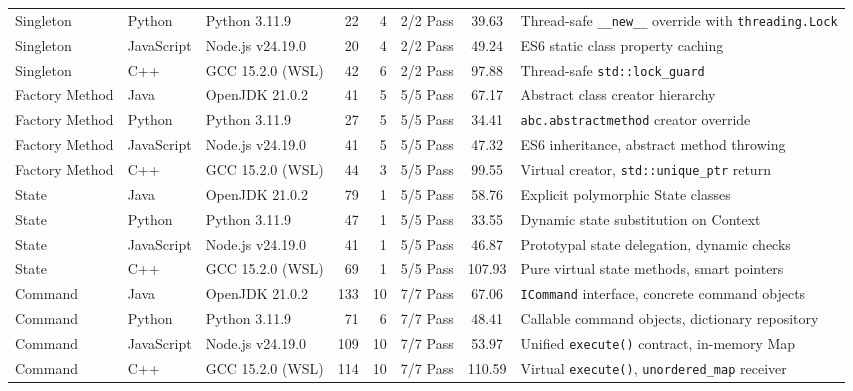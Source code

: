 \documentclass[11pt,a4paper]{article}
\begin{document}
\begin{xltabular}{\linewidth}{@{}p{22mm}p{16mm}p{25mm}rrrcX@{}}
Singleton & Python & Python 3.11.9 & 22 & 4 & 2/2 Pass & 39.63 & Thread-safe \texttt{\_\_new\_\_} override with \texttt{threading.Lock}\\
Singleton & JavaScript & Node.js v24.19.0 & 20 & 4 & 2/2 Pass & 49.24 & ES6 static class property caching\\
Singleton & C++ & GCC 15.2.0 (WSL) & 42 & 6 & 2/2 Pass & 97.88 & Thread-safe \texttt{std::lock\_guard}\\\midrule
Factory Method & Java & OpenJDK 21.0.2 & 41 & 5 & 5/5 Pass & 67.17 & Abstract class creator hierarchy\\
Factory Method & Python & Python 3.11.9 & 27 & 5 & 5/5 Pass & 34.41 & \texttt{abc.abstractmethod} creator override\\
Factory Method & JavaScript & Node.js v24.19.0 & 41 & 5 & 5/5 Pass & 47.32 & ES6 inheritance, abstract method throwing\\
Factory Method & C++ & GCC 15.2.0 (WSL) & 44 & 3 & 5/5 Pass & 99.55 & Virtual creator, \texttt{std::unique\_ptr} return\\\midrule
State & Java & OpenJDK 21.0.2 & 79 & 1 & 5/5 Pass & 58.76 & Explicit polymorphic State classes\\
State & Python & Python 3.11.9 & 47 & 1 & 5/5 Pass & 33.55 & Dynamic state substitution on Context\\
State & JavaScript & Node.js v24.19.0 & 41 & 1 & 5/5 Pass & 46.87 & Prototypal state delegation, dynamic checks\\
State & C++ & GCC 15.2.0 (WSL) & 69 & 1 & 5/5 Pass & 107.93 & Pure virtual state methods, smart pointers\\\midrule
Command & Java & OpenJDK 21.0.2 & 133 & 10 & 7/7 Pass & 67.06 & \texttt{ICommand} interface, concrete command objects\\
Command & Python & Python 3.11.9 & 71 & 6 & 7/7 Pass & 48.41 & Callable command objects, dictionary repository\\
Command & JavaScript & Node.js v24.19.0 & 109 & 10 & 7/7 Pass & 53.97 & Unified \texttt{execute()} contract, in-memory Map\\
Command & C++ & GCC 15.2.0 (WSL) & 114 & 10 & 7/7 Pass & 110.59 & Virtual \texttt{execute()}, \texttt{unordered\_map} receiver\\\bottomrule
\end{xltabular}
\normalsize
\end{document}
